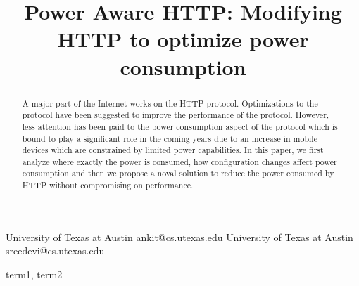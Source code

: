 \documentclass{sigplanconf}
\begin{document}
\setlength{\pdfpageheight}{\paperheight}
\setlength{\pdfpagewidth}{\paperwidth}






\title{Power Aware HTTP: Modifying HTTP to optimize power consumption}


{University of Texas at Austin}
           {ankit@cs.utexas.edu}
{University of Texas at Austin}
           {sreedevi@cs.utexas.edu}

\maketitle

\begin{abstract}
\noindent A major part of the Internet works on the HTTP protocol. Optimizations to the protocol have been suggested to improve the performance of the protocol. However, less attention has been paid to the power consumption aspect of the protocol which is bound to play a significant role in the coming years due to an increase in mobile devices which are constrained by limited power capabilities. In this paper, we first analyze where exactly the power is consumed, how configuration changes affect power consumption and then we propose a noval solution to reduce the power consumed by HTTP without compromising on performance. 

\end{abstract}


\terms
term1, term2
\end{document}
